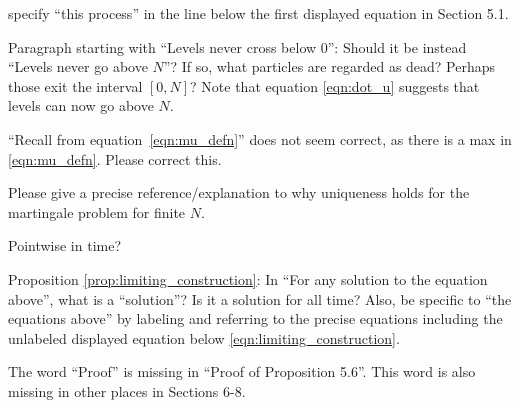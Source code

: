 \reply{
}

\begin{point}{\revref}
specify ``this process'' in the line below the first displayed equation in
Section 5.1.
\end{point}

\reply{
}

\begin{point}{\revref}
Paragraph starting with ``Levels never cross below 0'': Should it be instead ``Levels never
go above $N$''? If so, what particles are regarded as dead? Perhaps those exit the interval
$[0, N]$? Note that equation \eqref{eqn:dot_u} suggests that levels can now go above $N$.
\end{point}

\reply{
}

\begin{point}{\revref}
``Recall from equation~\eqref{eqn:mu_defn}''
does not seem correct, as there is a max in \eqref{eqn:mu_defn}. Please
correct this.
\end{point}

\reply{
}

\begin{point}{\revref}
Please give a precise reference/explanation to why uniqueness holds for the martingale problem for finite $N$.
\end{point}


\begin{point}{\revref}
    Pointwise in time?
\end{point}

\reply{
}

\begin{point}{\revref}
Proposition \ref{prop:limiting_construction}: In ``For any solution to the equation above'', what is a ``solution''? Is it
a solution for all time? Also, be specific to ``the equations above'' by labeling and referring
to the precise equations including the unlabeled displayed equation below \eqref{eqn:limiting_construction}.
\end{point}

\reply{
}

\begin{point}{\revref}
The word ``Proof'' is missing in ``Proof of Proposition 5.6''. This word is also
missing in other places in Sections 6-8.
\end{point}

